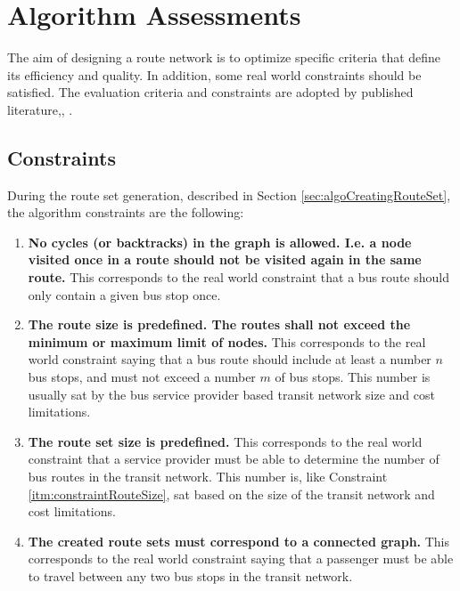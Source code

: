\section{Algorithm Assessments}
The aim of designing a route network is to optimize specific criteria that define its efficiency and quality. In addition, some real world constraints should be satisfied. The evaluation criteria and constraints are adopted by published literature\citep{kechagiopoulos14},\citep{fan09}, \citep{nikolic14}.

\subsection{Constraints}
\label{sec:algoConstraints}
During the route set generation, described in Section \vref{sec:algoCreatingRouteSet}, the algorithm constraints are the following:
\begin{enumerate}
\item \label{itm:constraintCycles} \textbf{No cycles (or backtracks) in the graph is allowed. I.e. a node visited once in a route should not be visited again in the same route.}
This corresponds to the real world constraint that a bus route should only contain a given bus stop once. 
\item \label{itm:constraintRouteSize} \textbf{The route size is predefined. The routes shall not exceed the minimum or maximum limit of nodes.}
This corresponds to the real world constraint saying that a bus route should include at least a number $n$ bus stops, and must not exceed a number $m$ of bus stops. This number is usually sat by the bus service provider based transit network size and cost limitations. 
\item \label{itm:constraintRouteSetSize} \textbf{The route set size is predefined.}
This corresponds to the real world constraint that a service provider must be able to determine the number of bus routes in the transit network. This number is, like Constraint \ref{itm:constraintRouteSize}, sat based on the size of the transit network and cost limitations. 
\item \label{itm:criteriaConnectedGraph} \textbf{The created route sets must correspond to a connected graph.}
This corresponds to the real world constraint saying that a passenger must be able to travel between any two bus stops in the transit network. 
\end{enumerate}

